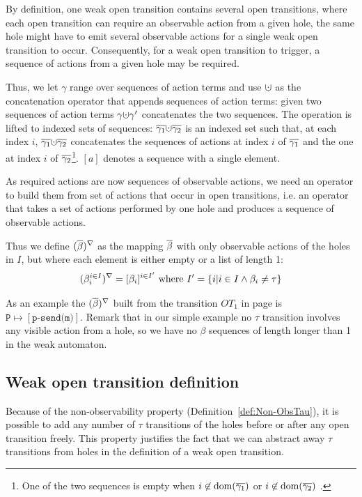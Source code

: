 \documentclass{lmcs}
\newcommand{\TODO}[1]{\textcolor{red}{\textbf{[TODO:#1]}}}
\begin{document}
By definition, one weak open transition contains  several open transitions, where  each open transition can require an observable action from a given hole, the same hole might have to emit several observable actions for a single weak open transition to occur. 
Consequently, for a weak open transition to trigger, a sequence of actions from a given hole may be required.

Thus, we let $\gamma$ range over sequences of action terms and use $\dotcup$ as the concatenation operator that appends sequences of action terms: given two sequences of action terms  $\gamma\dotcup\gamma '$ concatenates the two sequences. The operation is lifted to indexed sets of sequences:  $\set {\gamma_1}\dotcup \set {\gamma_2}$ is an indexed set such that, at each index $i$, $\set {\gamma_1}\dotcup \set {\gamma_2}$ concatenates the sequences of actions at index $i$ of $\overline{\gamma_1}$ and the one at index $i$ of $\overline{\gamma_2}$\footnote{One of the two sequences is empty when $i\not \in \operatorname{dom}(\overline{\gamma_1})$ or $i\not \in \operatorname{dom}(\overline{\gamma_2})$ .}. $[a]$ denotes a sequence with a single element.

As required actions are now sequences of observable actions, we need an operator to build them from set of actions that occur in open transitions, i.e. an operator that takes a set of actions performed by one hole and produces a sequence of observable actions.

Thus we define $(\overline{\beta})^{\nabla}$ as the mapping $\overline{\beta}$  with only observable actions of the holes in $I$, but where each element is either empty or a list of length 1:
 \[(\beta_i^{i\in I})^{\nabla} = [\beta_i]^{i\in I'}\text{ where }I'=\left\{i| i\in I \land \beta_i\neq \tau\right\}\]

As an example the $(\overline{\beta})^{\nabla}$ built from the transition $OT_1$ in page \pageref{OT:SimpleProt} is $\texttt{P}\mapsto [\texttt{p-send(m)}]$. Remark that in our simple example no $\tau$ transition involves any visible action from a hole, so we have no $\beta$ sequences of length longer than 1 in the weak automaton.

\subsection{Weak open transition definition}

Because of the non-observability property (Definition~\ref{def:Non-ObsTau}), it is possible to add any number of $\tau$ transitions of the holes before or after any open transition freely. This property justifies the fact that we can abstract away $\tau$ transitions from holes in the definition of a weak open transition.
\end{document}
